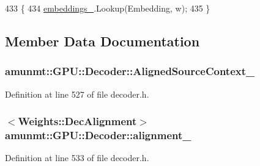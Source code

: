 \begin{DoxyCode}
433                                           \{
434       \hyperlink{classamunmt_1_1GPU_1_1Decoder_a05262f3f89bc3aec8cb5dbd4e695dbb7}{embeddings\_}.Lookup(Embedding, w);
435     \}
\end{DoxyCode}


\subsection{Member Data Documentation}
\subsubsection[{\texorpdfstring{Aligned\+Source\+Context\+\_\+}{AlignedSourceContext_}}]{ amunmt\+::\+G\+P\+U\+::\+Decoder\+::\+Aligned\+Source\+Context\+\_\+\hspace{0.3cm}{\ttfamily [private]}}\hypertarget{classamunmt_1_1GPU_1_1Decoder_af5bab1c2275d7e364107d32fb7b0bf88}{}\label{classamunmt_1_1GPU_1_1Decoder_af5bab1c2275d7e364107d32fb7b0bf88}


Definition at line 527 of file decoder.\+h.

\subsubsection[{\texorpdfstring{alignment\+\_\+}{alignment_}}]{$<${\bf Weights\+::\+Dec\+Alignment}$>$ amunmt\+::\+G\+P\+U\+::\+Decoder\+::alignment\+\_\+\hspace{0.3cm}{\ttfamily [private]}}\hypertarget{classamunmt_1_1GPU_1_1Decoder_a019654e13f5f172611f6f960dd1fa0b5}{}\label{classamunmt_1_1GPU_1_1Decoder_a019654e13f5f172611f6f960dd1fa0b5}


Definition at line 533 of file decoder.\+h.

